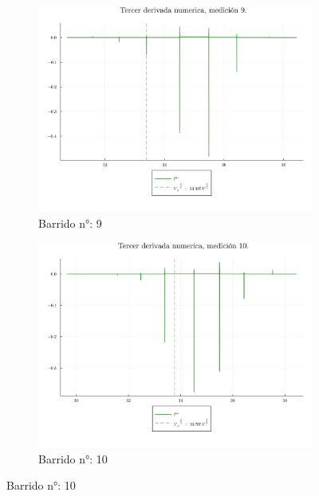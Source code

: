 \begin{figure}[H]
	\ContinuedFloat %
	\centering
	\begin{subfigure}[b]{0.49\textwidth}
		\centering
		\includegraphics[width=\linewidth]{img/potderst9.png}
		\caption{Barrido n°: 9}
		\label{fig:potderst9}
	\end{subfigure}
	\hfill
	\begin{subfigure}[b]{0.49\textwidth}
		\centering
		\includegraphics[width=\linewidth]{img/potderst10.png}
		\caption{Barrido n°: 10}
		\label{fig:potderst10}
	\end{subfigure}
	

\end{figure}
